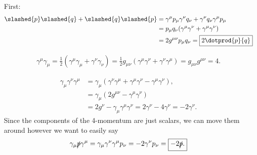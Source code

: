 \section{}

\newcommand{\psl}{\slashed{p}}
\newcommand{\gsl}{\slashed{q}}

\begin{parts}
    \item First:
        \begin{align*}
            \psl\gsl + \gsl\psl &= \gamma^{\mu}p_{\mu}\gamma^{\nu}q_{\nu} + \gamma^{\nu}q_{\nu}\gamma^{\mu}p_{\mu} \\
            &= p_{\mu}q_{\nu}(\gamma^{\mu}\gamma^{\nu} + \gamma^{\mu}\gamma^{\nu}) \\
            &= 2g^{\mu\nu}p_{\mu}q_{\nu} = \boxed{2\dotprod{p}{q}}
        \end{align*}
    
    \item 
        \begin{align*}
            \gamma^{\mu}\gamma_{\mu} = \frac{1}{2}(\gamma^{\mu}\gamma_{\mu} + \gamma^{\nu}\gamma_{\nu}) = \frac{1}{2}g_{\mu\nu}(\gamma^{\mu}\gamma^{\nu} + \gamma^{\nu}\gamma^{\mu}) = g_{\mu\nu}g^{\mu\nu} = \boxed{4.}
        \end{align*}

    \item 
        \begin{align*}
            \gamma_{\mu}\gamma^{\nu}\gamma^{\mu} &= \gamma_{\mu}(\gamma^{\nu}\gamma^{\mu} + \gamma^{\mu}\gamma^{\nu} - \gamma^{\mu}\gamma^{\nu}), \\
            &= \gamma_{\mu}(2g^{\mu\nu} - \gamma^{\mu}\gamma^{\nu}) \\
            &= 2g^{\nu} - \gamma_{\mu}\gamma^{\mu}\gamma^{\nu} = 2\gamma^{\nu} - 4\gamma^{\nu} = \boxed{-2\gamma^{\nu}.}
        \end{align*}
        Since the components of the 4-momentum are just scalars, we can move them around however we want to easily say
        \begin{equation*}
            \gamma_{\mu}\psl\gamma^{\mu} = \gamma_{\mu}\gamma^{\nu}\gamma^{\mu}p_{\nu} = -2\gamma^{\nu}p_{\nu} = \boxed{-2\psl.}
        \end{equation*}
\end{parts}